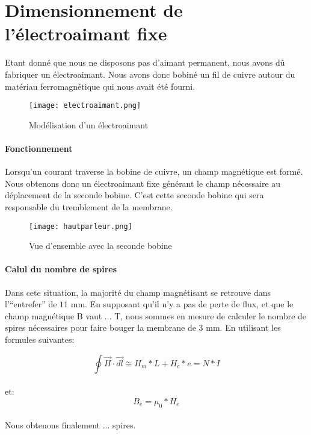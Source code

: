 

\section{Dimensionnement de l'électroaimant fixe}

Etant donné que nous ne disposons pas d'aimant permanent, nous avons dû fabriquer un électroaimant. 
Nous avons donc bobiné un fil de cuivre autour du matériau ferromagnétique qui nous avait été fourni. 

\begin{figure}[h]
\centering
\texttt{[image: electroaimant.png]}
\caption{Modélisation d'un électroaimant}
\label{modélisation de l'électroaimant}
\end{figure}

\paragraph{Fonctionnement}
Lorsqu'un courant traverse la bobine de cuivre, un champ magnétique est formé.  Nous obtenons 
donc un électroaimant fixe générant le champ nécessaire au déplacement de la seconde bobine. 
C'est cette seconde bobine qui sera responsable du tremblement de la membrane.

\begin{figure}[h]
\centering
\texttt{[image: hautparleur.png]}
\caption{Vue d'ensemble avec la seconde bobine}
\label{Vue d'ensemble avec la seconde bobine}
\end{figure}

\paragraph{Calul du nombre de spires}
Dans cete situation, la majorité du champ magnétisant se retrouve dans l'"`entrefer"' de $11$ mm. En supposant qu'il n'y a pas de perte de flux, et que le champ magnétique B vaut  ... T, nous sommes en mesure de calculer le nombre de spires nécessaires pour faire bouger la membrane de $3$ mm. %
En utilisant les formules suivantes:

$$\oint \vec{H}\cdot\vec{dl}\cong H_m * L + H_e * e = N*I$$ \\
et:
$$B_e = \mu_0*H_e$$\\

Nous obtenons finalement ... spires.



